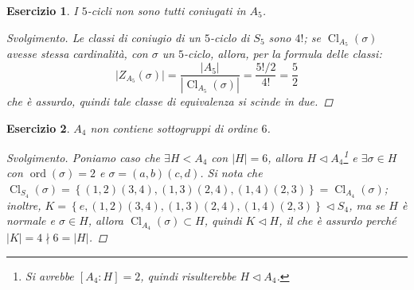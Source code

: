 \documentclass[11pt]{scrartcl}
\theoremstyle{style1}
\newtheorem{esercizio}{Esercizio}[section]
\newenvironment{svolgimento}{\renewcommand\qedsymbol{$\blacksquare$}\begin{proof}[Svolgimento]}{\end{proof}}
\numberwithin{equation}{subsection}
\begin{document}
\begin{esercizio}
I $5$-cicli non sono tutti coniugati in $A_5$.
\begin{svolgimento}
	Le classi di coniugio di un $5$-ciclo di $S_5$ sono $4!$; se $\operatorname{Cl} _{A_5} (\sigma )$ avesse stessa cardinalit\`a, con $\sigma $ un $5$-ciclo, allora, per la formula delle classi:
	\[
	\lvert Z_{A_5} (\sigma ) \rvert  = \frac{\lvert A_5 \rvert }{|\operatorname{Cl} _{A_5} (\sigma )|}= \frac{5! /2 }{4!} = \frac{5}{2}
	\] 
	che \`e assurdo, quindi tale classe di equivalenza si scinde in due.
\end{svolgimento}
\end{esercizio}
\begin{esercizio}
$A_4$ non contiene sottogruppi di ordine $6$.
\begin{svolgimento}
	Poniamo caso che $\exists H < A_4$ con $|H| = 6$, allora $H \lhd A_4$\footnote{Si avrebbe $[A_4:H] = 2$, quindi risulterebbe $H\lhd A_4$.} e $\exists \sigma  \in H$ con $\operatorname{ord}(\sigma ) =2$ e $\sigma = (a,b)(c,d)$. 
	Si nota che $\operatorname{Cl}_{S_4} (\sigma ) = \left\{ (1,2)(3,4),(1,3)(2,4),(1,4)(2,3) \right\} = \operatorname{Cl} _{A_4} (\sigma )$; inoltre, $K = \left\{e, (1,2)(3,4),(1,3)(2,4),(1,4)(2,3) \right\}\lhd S_4$, ma se $H$ \`e normale e $\sigma  \in H$, allora $\operatorname{Cl} _{A_4} (\sigma ) \subset H$, quindi $K \lhd H$, il che \`e assurdo perch\'e $\lvert K \rvert =4  \nmid 6 = \lvert H \rvert $.
\end{svolgimento}
\end{esercizio}
\end{document}
